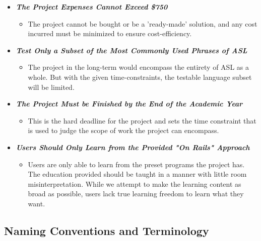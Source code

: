 \documentclass[12pt, titlepage]{article}
\begin{document}
\begin{itemize}
    \item[] \textbf{\textit{The Project Expenses Cannot Exceed \$750}}
    \begin{itemize}
        \item The project cannot be bought or be a 'ready-made' solution, and any cost incurred must be minimized to ensure cost-efficiency.
    \end{itemize}
    \item[] \textbf{\textit{Test Only a Subset of the Most Commonly Used Phrases of ASL}}
    \begin{itemize}
        \item The project in the long-term would encompass the entirety of ASL as a whole. But with the given time-constraints, the testable language subset will be limited.
    \end{itemize}
    \item[] \textbf{\textit{The Project Must be Finished by the End of the Academic Year}}
    \begin{itemize}
        \item This is the hard deadline for the project and sets the time constraint that is used to judge the scope of work the project can encompass.
    \end{itemize}
    \item[] \textbf{\textit{Users Should Only Learn from the Provided "On Rails" Approach}}
    \begin{itemize}
        \item Users are only able to learn from the preset programs the project has. The education provided should be taught in a manner with little room misinterpretation. While we attempt to make the learning content as broad as possible, users lack true learning freedom to learn what they want.
    \end{itemize}
\end{itemize}

\subsection{Naming Conventions and Terminology}
\end{document}
